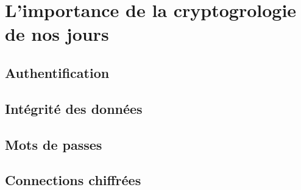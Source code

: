 \chapter{L'importance de la cryptogrologie de nos jours}
\section{Authentification\label{sec:Authentification}}
\section{Intégrité des données}
\section{Mots de passes}
\section{Connections chiffrées}

